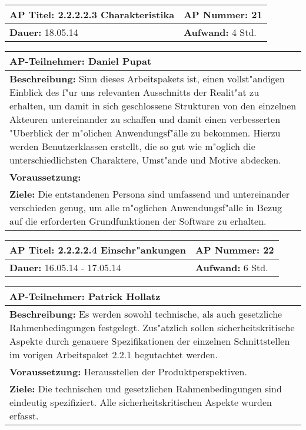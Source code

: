 \begin{tabular}{|p{7.43cm}|p{7.43cm}|}
\hline
\textbf{AP Titel: }2.2.2.2.3 Charakteristika & \textbf{AP Nummer: }21\\ 
\hline
\textbf{Dauer: }18.05.14& \textbf{Aufwand: } 4 Std.\\
\hline
\end{tabular}
\begin{tabular}{|p{15.3cm}|}
\hline
\textbf{AP-Teilnehmer: }Daniel Pupat\\
\hline
\textbf{Beschreibung: }Sinn dieses Arbeitspakets ist, einen vollst"andigen Einblick des f"ur uns relevanten Ausschnitts der Realit"at zu erhalten, um damit in sich geschlossene Strukturen von den einzelnen Akteuren untereinander zu schaffen und damit einen verbesserten "Uberblick der m"olichen Anwendungsf"älle zu bekommen. Hierzu werden Benutzerklassen erstellt, die so gut wie m"oglich die unterschiedlichsten Charaktere, Umst"ande und Motive abdecken.
\\
\hline
\textbf{Voraussetzung: }\\
\hline 
\textbf{Ziele: }Die entstandenen Persona sind umfassend und untereinander verschieden genug, um alle m"oglichen Anwendungsf"alle in Bezug auf die erforderten Grundfunktionen der Software zu erhalten.
\\
\hline 
\end{tabular}

\begin{tabular}{|p{7.43cm}|p{7.43cm}|}
\hline
\textbf{AP Titel: }2.2.2.2.4 Einschr"ankungen& \textbf{AP Nummer: }22\\ 
\hline
\textbf{Dauer: }16.05.14 - 17.05.14& \textbf{Aufwand: } 6 Std.\\
\hline
\end{tabular}
\begin{tabular}{|p{15.3cm}|}
\hline
\textbf{AP-Teilnehmer: }Patrick Hollatz\\
\hline
\textbf{Beschreibung: }Es werden sowohl technische, als auch gesetzliche Rahmenbedingungen festgelegt. Zus"atzlich sollen sicherheitskritische Aspekte durch genauere Spezifikationen der einzelnen Schnittstellen im vorigen Arbeitspaket 2.2.1 begutachtet werden.\\
\hline
\textbf{Voraussetzung: }Herausstellen der Produktperspektiven.\\
\hline 
\textbf{Ziele: }Die technischen und gesetzlichen Rahmenbedingungen sind eindeutig spezifiziert. Alle sicherheitskritischen Aspekte wurden erfasst.\\
\hline 
\end{tabular}

